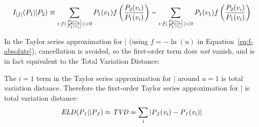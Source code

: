{\begin{equation*} \label{eq:f-absolute}
I_{|f|}(P_{1}||P_{2}) \equiv \sum_{i:f(\frac{P_{2}(v_{i})}{P_{1}(v_{i})})>0} P_{1}(v_{1}) f\left(\frac{P_{2}(v_{i})}{P_{1}(v_{i})}\right) - \sum_{i:f(\frac{P_{2}(v_{i})}{P_{1}(v_{i})})<0} P_{1}(v_{1}) f\left(\frac{P_{2}(v_{i})}{P_{1}(v_{i})}\right)
\end{equation*}

In the Taylor series approximation for $\mid$ (using $f=-\ln(u)$ in Equation~\eqref{eq:f-absolute}), cancellation is avoided, so the first-order term does {\em not} vanish, and is in fact equivalent to the Total Variation Distance:

\begin{proposition} The $i=1$ term in the Taylor series approximation for  $\mid$ around $u=1$ is total variation distance. Therefore 
the first-order Taylor series approximation for $\mid$ is total variation distance:
$$\it{ELD}(P_{1}||P_{2}) \approx  TVD =  \sum_{i} |P_{2}(v_{i})-P_{1}(v_{i})|$$
\end{proposition}




%
%				
%				
%				
				
}

